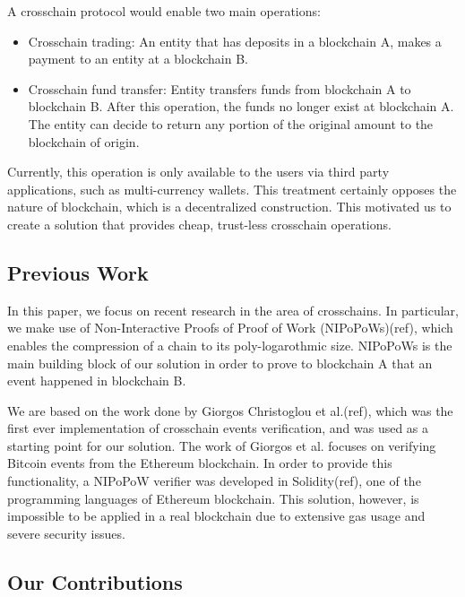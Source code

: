 \documentclass{article}
\begin{document}
  \bigbreak A crosschain protocol would enable two main operations:
  \begin{itemize}
  \item
    Crosschain trading: An entity that has deposits in a blockchain A,
    makes a payment to an entity at a blockchain B.
  \item
    Crosschain fund transfer: Entity transfers funds from blockchain A
    to blockchain B. After this operation, the funds no longer exist at
    blockchain A. The entity can decide to return any portion of the
    original amount to the blockchain of origin.
  \end{itemize}

  Currently, this operation is only available to the users via third
  party applications, such as multi-currency wallets. This treatment
  certainly opposes the nature of blockchain, which is a decentralized
  construction. This motivated us to create a solution that provides
  cheap, trust-less crosschain operations.

  \subsection{Previous Work}

  In this paper, we focus on recent research in the area of crosschains.
  In particular, we make use of Non-Interactive Proofs of Proof of Work
  (NIPoPoWs)(ref), which enables the compression of a chain to its
  poly-logarothmic size. NIPoPoWs is the main building block of our
  solution in order to prove to blockchain A that an event happened in
  blockchain B.

  We are based on the work done by Giorgos Christoglou et al.(ref),
  which was the first ever implementation of crosschain events
  verification, and was used as a starting point for our solution. The
  work of Giorgos et al. focuses on verifying Bitcoin events from the
  Ethereum blockchain. In order to provide this functionality, a NIPoPoW
  verifier was developed in Solidity(ref), one of the programming
  languages of Ethereum blockchain. This solution, however, is
  impossible to be applied in a real blockchain due to extensive gas
  usage and severe security issues.

  \subsection{Our Contributions}
\end{document}
